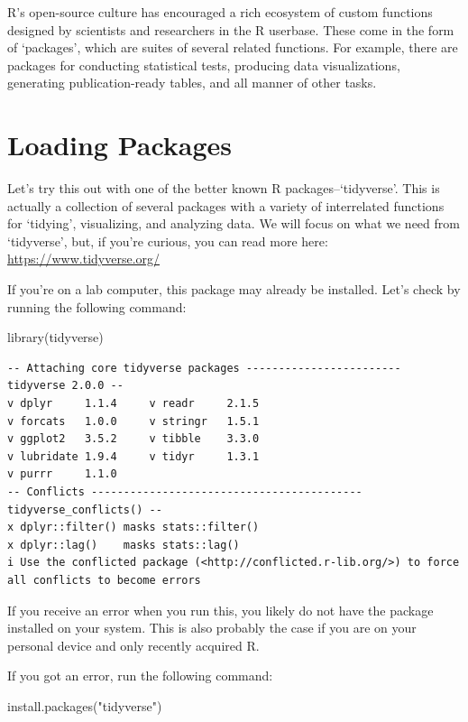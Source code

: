 \documentclass[
  letterpaper,
  DIV=11,
  numbers=noendperiod]{scrreprt}
\newenvironment{Shaded}{\begin{snugshade}}{\end{snugshade}}
\newcommand{\FunctionTok}[1]{\textcolor[rgb]{0.28,0.35,0.67}{#1}}
\newcommand{\NormalTok}[1]{\textcolor[rgb]{0.00,0.23,0.31}{#1}}
\newcommand{\StringTok}[1]{\textcolor[rgb]{0.13,0.47,0.30}{#1}}
\begin{document}
R's open-source culture has encouraged a rich ecosystem of custom
functions designed by scientists and researchers in the R userbase.
These come in the form of `packages', which are suites of several
related functions. For example, there are packages for conducting
statistical tests, producing data visualizations, generating
publication-ready tables, and all manner of other tasks.

\section{Loading Packages}\label{loading-packages}

Let's try this out with one of the better known R packages--`tidyverse'.
This is actually a collection of several packages with a variety of
interrelated functions for `tidying', visualizing, and analyzing data.
We will focus on what we need from `tidyverse', but, if you're curious,
you can read more here: \url{https://www.tidyverse.org/}

If you're on a lab computer, this package may already be installed.
Let's check by running the following command:

\begin{Shaded}
\begin{Highlighting}[]
\FunctionTok{library}\NormalTok{(tidyverse)}
\end{Highlighting}
\end{Shaded}

\begin{verbatim}
-- Attaching core tidyverse packages ------------------------ tidyverse 2.0.0 --
v dplyr     1.1.4     v readr     2.1.5
v forcats   1.0.0     v stringr   1.5.1
v ggplot2   3.5.2     v tibble    3.3.0
v lubridate 1.9.4     v tidyr     1.3.1
v purrr     1.1.0     
-- Conflicts ------------------------------------------ tidyverse_conflicts() --
x dplyr::filter() masks stats::filter()
x dplyr::lag()    masks stats::lag()
i Use the conflicted package (<http://conflicted.r-lib.org/>) to force all conflicts to become errors
\end{verbatim}

If you receive an error when you run this, you likely do not have the
package installed on your system. This is also probably the case if you
are on your personal device and only recently acquired R.

If you got an error, run the following command:

\begin{Shaded}
\begin{Highlighting}[]
\FunctionTok{install.packages}\NormalTok{(}\StringTok{"tidyverse"}\NormalTok{)}
\end{Highlighting}
\end{Shaded}
\end{document}
